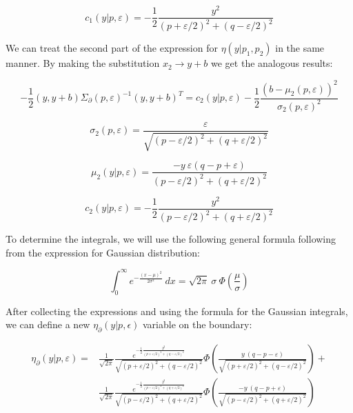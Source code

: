 \documentclass{article}
\theoremstyle{definition}
\begin{document}
\begin{equation}
    c_1(y|p,\varepsilon) = - \frac{1}{2} \frac{y^2}{(p+\varepsilon/2)^2+(q-\varepsilon/2)^2}
\end{equation}

We can treat the second part of the expression for $\eta(y|p_1,p_2)$ in the same manner. By making the substitution $x_2 \to y+b$ we get the analogous results:

\begin{equation}
    -\frac{1}{2} (y,y+b) \Sigma_\partial(p,\varepsilon)^{-1} (y,y+b)^T = c_2(y|p,\varepsilon) - \frac{1}{2} \frac{(b-\mu_2(p,\varepsilon))^2}{\sigma_2(p,\varepsilon)^2} 
\end{equation}

\begin{equation}
    \sigma_2(p,\varepsilon) = \frac{\varepsilon}{\sqrt{(p-\varepsilon/2)^2+(q+\varepsilon/2)^2}}
\end{equation}

\begin{equation}
    \mu_2(y|p,\varepsilon)
    =
    \frac{-y \ \varepsilon (q-p+\varepsilon)}{(p-\varepsilon/2)^2+(q+\varepsilon/2)^2}
\end{equation}

\begin{equation}
    c_2(y|p,\varepsilon) = - \frac{1}{2} \frac{y^2}{(p-\varepsilon/2)^2+(q+\varepsilon/2)^2}
\end{equation}

To determine the integrals, we will use the following general formula following from the expression for Gaussian distribution:

\begin{equation}
    \int_0^\infty e^{-\frac{(x-\mu)^2}{2 \sigma^2}} \ dx
    =
    \sqrt{2 \pi} \ \sigma \ \Phi \left( \frac{\mu}{\sigma} \right )
\end{equation}

After collecting the expressions and using the formula for the Gaussian integrals, we can define a new $\eta_\partial(y|p,\epsilon)$ variable on the boundary:

\begin{equation}
\begin{split}
    \eta_\partial(y|p,\varepsilon)
    = &
    \frac{1}{\sqrt{2 \pi}} \frac{e^{- \frac{1}{2} \frac{y^2}{(p+\varepsilon/2)^2+(q-\varepsilon/2)^2}}}{\sqrt{(p+\varepsilon/2)^2+(q-\varepsilon/2)^2}}
    \Phi \left( 
    \frac
    {
    y \ (q-p-\varepsilon)}
    {\sqrt{(p+\varepsilon/2)^2+(q-\varepsilon/2)^2}} 
    \right ) + \\
    &
    \frac{1}{\sqrt{2 \pi}} \frac{e^{- \frac{1}{2} \frac{y^2}{(p-\varepsilon/2)^2+(q+\varepsilon/2)^2}}}{\sqrt{(p-\varepsilon/2)^2+(q+\varepsilon/2)^2}}
    \Phi \left( 
    \frac
    {
    -
    y \ (q-p+\varepsilon)}
    {\sqrt{(p-\varepsilon/2)^2+(q+\varepsilon/2)^2}} 
    \right )
\end{split}
\end{equation}
\end{document}
